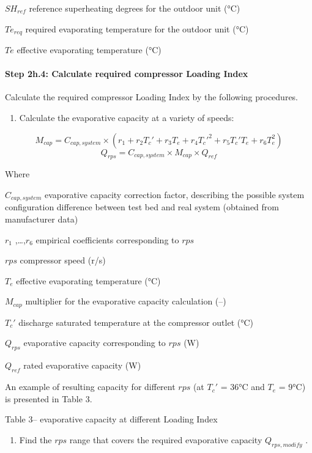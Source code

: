 \(SH_{ref}\) reference superheating degrees for the outdoor unit (°C)

\(Te_{req}\) required evaporating temperature for the outdoor unit (°C)

\(Te\) effective evaporating temperature (°C)

\paragraph{Step 2h.4: Calculate required compressor Loading Index}\label{step-2h.4-calculate-required-compressor-loading-index}

Calculate the required compressor Loading Index by the following procedures.

\begin{enumerate}
\def\labelenumi{\alph{enumi}.}
\tightlist
\item
  Calculate the evaporative capacity at a variety of speeds:
\end{enumerate}

\[M_{cap} = C_{cap,system}\times(r_1+r_2{T_c}'+r_3T_e+r_4{T_c}'^2+r_5{T_c}'T_e+r_6T_e^2)\] \[Q_{rps} = C_{cap,system} \times M_{cap} \times Q_{ref}\]

Where

\(C_{cap,system}\) evaporative capacity correction factor, describing the possible system configuration difference between test bed and real system (obtained from manufacturer data)

\(r_1\) ,\ldots{},\(r_6\) empirical coefficients corresponding to \(rps\)

\(rps\) compressor speed (r/s)

\(T_e\) effective evaporating temperature (°C)

\(M_{cap}\) multiplier for the evaporative capacity calculation (--)

\({T_c}'\) discharge saturated temperature at the compressor outlet (°C)

\(Q_{rps}\) evaporative capacity corresponding to \(rps\) (W)

\(Q_{ref}\) rated evaporative capacity (W)

An example of resulting capacity for different \(rps\) (at \({T_c}'\) = 36°C and \(T_e\) = 9°C) is presented in Table 3.

Table 3-- evaporative capacity at different Loading Index



\begin{enumerate}
\def\labelenumi{\alph{enumi}.}
\setcounter{enumi}{1}
\tightlist
\item
  Find the \(rps\) range that covers the required evaporative capacity \(Q_{rps,modify}\) .
\end{enumerate}

